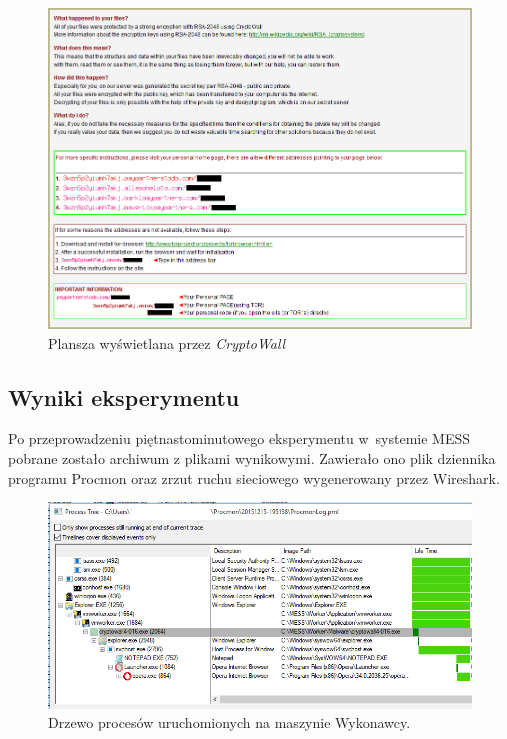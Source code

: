 \documentclass[a4paper,12pt,oneside]{article}
\begin{document}
	\begin{figure}[ht]
		\includegraphics[scale=0.42]{gfx/cryptowall-message.png}
		\caption{Plansza wyświetlana przez \textit{CryptoWall}}
		\label{gfx-cryptowall-message}
	\end{figure}
	
	\subsection{Wyniki eksperymentu}
	
	Po przeprowadzeniu piętnastominutowego eksperymentu w~systemie MESS pobrane zostało archiwum z plikami wynikowymi. Zawierało ono plik dziennika programu Procmon oraz zrzut ruchu sieciowego wygenerowany przez Wireshark.
	
	\begin{figure}[ht]
		\includegraphics[scale=0.66]{gfx/anal-1-ptree.PNG}
		\caption{Drzewo procesów uruchomionych na maszynie Wykonawcy.}
		\label{gfx-anal-1-ptree}
	\end{figure}
	
\end{document}
